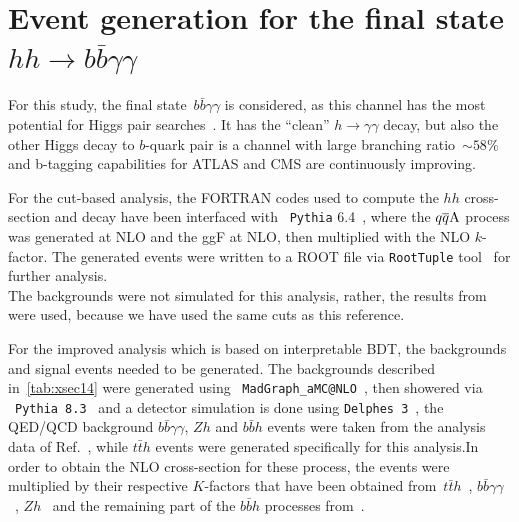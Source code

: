 \section{Event generation for the final state $ hh \to b \bar b \gamma \gamma$ \label{sec:evnt}}
For this study, the final state~$b \bar{b} \gamma \gamma$ is considered, as this channel has the most potential for Higgs pair searches~\cite{Cepeda:2019klc}. It has the ``clean'' $h \to \gamma \gamma$ decay, but also the other Higgs decay to $b$-quark pair is a channel with large branching ratio~$\sim 58\%$ and b-tagging capabilities for ATLAS and CMS are continuously improving. \\
\par 
For the cut-based analysis, the FORTRAN codes used to compute the $hh$ cross-section and decay have been interfaced with ~\texttt{Pythia} 6.4~\cite{Sjostrand:2006za}, where the $q\overline q \rm A$ process was generated at NLO and the ggF at NLO, then multiplied with the NLO $k$-factor. The generated events were written to a ROOT file via \texttt{RootTuple} tool~\cite{roottuple} for further analysis. \\ The backgrounds were not simulated for this analysis, rather, the results from ~\cite{Azatov:2015oxa} were used, because we have used the same cuts as this reference.
\par 
For the improved analysis which is based on interpretable BDT, the backgrounds and signal events needed to be generated. The backgrounds described in~\autoref{tab:xsec14} were generated using~ \texttt{MadGraph\_aMC@NLO}~\cite{Alwall:2014hca}, then showered via ~\texttt{Pythia 8.3}~\cite{Sjostrand:2014zea} and a detector simulation is done using \texttt{Delphes 3}~\cite{deFavereau:2013fsa}, the QED/QCD background $ b \bar b\gamma \gamma$, $Zh$  and $ b \bar b h$ events were taken from the analysis data of Ref.~\cite{Grojean:2020ech}, while $t \bar t h $ events were generated specifically for this analysis.In order to obtain the NLO cross-section for these process, the events were multiplied by their respective $K$-factors that have been obtained from~$t\bar{t}h$~\cite{Beenakker:2001rj}, $b\bar b \gamma\gamma$~\cite{Fah:2017wlf}, $Zh$~\cite{Campanario:2014lza} and the remaining part of the $b\bar bh$ processes from~\cite{Dawson:2005vi}. \\ 
